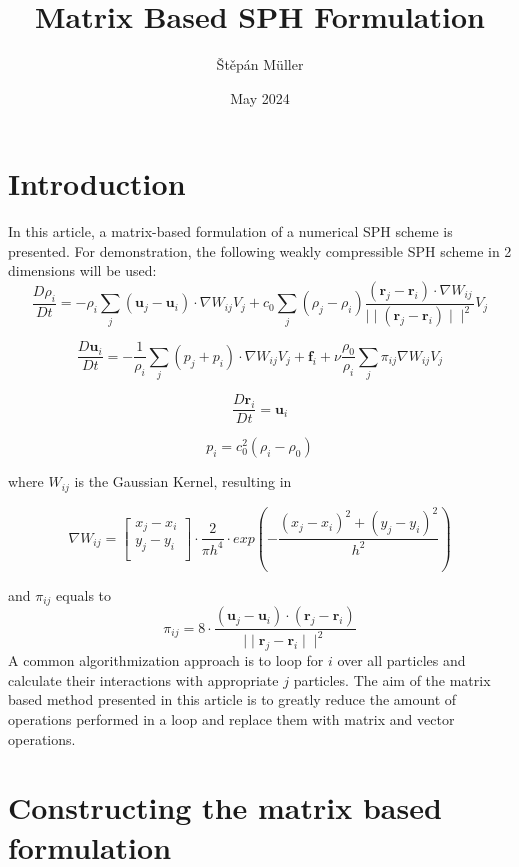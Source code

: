 \documentclass{article}
\title{Matrix Based SPH Formulation}
\author{Štěpán Müller}
\date{May 2024}
\begin{document}
\maketitle

\section{Introduction}
In this article, a matrix-based formulation of a numerical SPH scheme is presented. 
For demonstration, the following weakly compressible SPH scheme in 2 dimensions will be used:
$$\frac{D\rho_i}{Dt}=-\rho_i\sum_j\left(\textbf{u}_j-\textbf{u}_i\right)\cdot\nabla W_{ij}V_j+c_0\sum_j\left(\rho_j-\rho_i\right)\frac{\left(\textbf{r}_j-\textbf{r}_i\right)\cdot \nabla W_{ij}}{\mid\mid\left(\textbf{r}_j-\textbf{r}_i\right)\mid\mid^2}V_j$$

$$\frac{D\textbf{u}_i}{Dt}=-\frac{1}{\rho_i}\sum_j\left(p_j+p_i\right)\cdot\nabla W_{ij}V_j+\textbf{f}_i+\nu\frac{\rho_0}{\rho_i}\sum_j\pi_{ij}\nabla W_{ij}V_j$$

$$\frac{D\textbf{r}_i}{Dt}=\textbf{u}_i$$

$$p_i=c_0^2\left(\rho_i-\rho_0\right)$$

where $W_{ij}$ is the Gaussian Kernel, resulting in

$$\nabla W_{ij}= 
\begin{bmatrix}
x_j - x_i \\
y_j - y_i \\
\end{bmatrix}
\cdot\frac{2}{\pi h^4}\cdot exp\left(-\frac{\left(x_j-x_i\right)^2+\left(y_j-y_i\right)^2}{h^2}\right)$$

and $\pi_{ij}$ equals to
$$\pi_{ij}=8\cdot\frac{\left(\textbf{u}_j-\textbf{u}_i\right)\cdot\left(\textbf{r}_j-\textbf{r}_i\right)}{\mid\mid\textbf{r}_j-\textbf{r}_i\mid\mid^2}$$
A common algorithmization approach is to loop for $i$ over all particles and calculate their interactions with appropriate $j$ particles. The aim of the matrix based method presented in this article is to greatly reduce the amount of operations performed in a loop and replace them with matrix and vector operations.

\section{Constructing the matrix based formulation}
\end{document}
